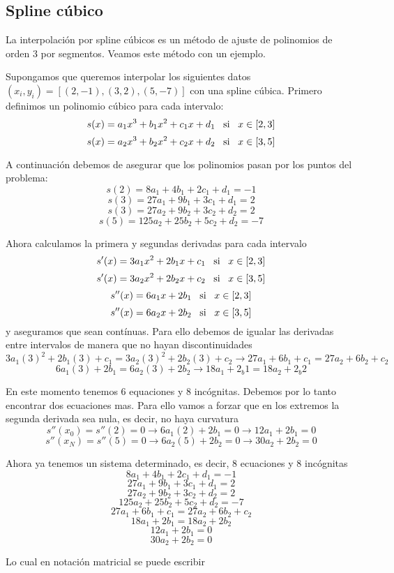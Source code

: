 \documentclass[
]{agujournal2019}
\begin{document}
\hypertarget{spline-cuxfabico}{%
\subsection{Spline cúbico}\label{spline-cuxfabico}}

La interpolación por spline cúbicos es un método de ajuste de polinomios
de orden 3 por segmentos. Veamos este método con un ejemplo.

Supongamos que queremos interpolar los siguientes datos
\((x_i,y_i)=[(2,-1), (3,2), (5,-7)]\) con una spline cúbica. Primero
definimos un polinomio cúbico para cada intervalo:
\[s(x)=a_1x^3 + b_1 x^2 +c_1x +d_1\,\,\,\,\,{\rm si}\,\,\,\,\,x\in[2,3]\]
\[s(x)=a_2x^3 + b_2 x^2 +c_2x +d_2\,\,\,\,\,{\rm si}\,\,\,\,\,x\in[3,5]\]

A continuación debemos de asegurar que los polinomios pasan por los
puntos del problema: \[s(2)=8a_1 + 4b_1  +2c_1 +d_1=-1\]
\[s(3)=27a_1 + 9b_1  +3c_1 +d_1=2\] \[s(3)=27a_2 + 9b_2  +3c_2 +d_2=2\]
\[s(5)=125a_2 + 25b_2  +5c_2 +d_2=-7\]

Ahora calculamos la primera y segundas derivadas para cada intervalo
\[s'(x)=3a_1x^2+2b_1x+c_1\,\,\,\,\,{\rm si}\,\,\,\,\,x\in[2,3]\]
\[s'(x)=3a_2x^2+2b_2x+c_2\,\,\,\,\,{\rm si}\,\,\,\,\,x\in[3,5]\]
\[s''(x)=6a_1x+2b_1\,\,\,\,\,{\rm si}\,\,\,\,\,x\in[2,3]\]
\[s''(x)=6a_2x+2b_2\,\,\,\,\,{\rm si}\,\,\,\,\,x\in[3,5]\] y aseguramos
que sean contínuas. Para ello debemos de igualar las derivadas entre
intervalos de manera que no hayan discontinuidades
\[3a_1(3)^2+2b_1(3)+c_1=3a_2(3)^2+2b_2(3)+c_2\rightarrow 27a_1+6b_1+c_1=27a_2+6b_2+c_2\]
\[6a_1(3)+2b_1=6a_2(3)+2b_2\rightarrow 18a_1+2_b1=18a_2+2_b2\]

En este momento tenemos 6 equaciones y 8 incógnitas. Debemos por lo
tanto encontrar dos ecuaciones mas. Para ello vamos a forzar que en los
extremos la segunda derivada sea nula, es decir, no haya curvatura
\[s''(x_0)=s''(2)=0\rightarrow 6a_1(2)+2b_1=0 \rightarrow 12a_1 + 2b_1=0\]
\[s''(x_N)=s''(5)=0\rightarrow 6a_2(5)+2b_2=0 \rightarrow 30a_2+2b_2=0\]

Ahora ya tenemos un sistema determinado, es decir, 8 ecuaciones y 8
incógnitas \[8a_1 + 4b_1  +2c_1 +d_1=-1\] \[27a_1 + 9b_1  +3c_1 +d_1=2\]
\[27a_2 + 9b_2  +3c_2 +d_2=2\] \[125a_2 + 25b_2  +5c_2 +d_2=-7\]
\[27a_1+6b_1+c_1=27a_2+6b_2+c_2\] \[18a_1+2b_1=18a_2+2b_2\]
\[12a_1 + 2b_1=0\] \[30a_2+2b_2=0\]

Lo cual en notación matricial se puede escribir
\end{document}
